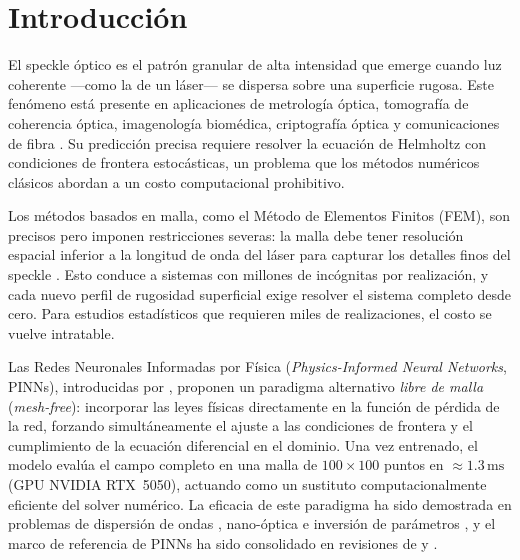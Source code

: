 
\section{Introducción}
\label{sec:intro}

El speckle óptico es el patrón granular de alta intensidad que emerge cuando luz coherente
---como la de un láser--- se dispersa sobre una superficie rugosa.
Este fenómeno está presente en aplicaciones de metrología óptica, tomografía de coherencia
óptica, imagenología biomédica, criptografía óptica y comunicaciones de fibra
\citep{Goodman2007_Speckle}.
Su predicción precisa requiere resolver la ecuación de Helmholtz con condiciones de frontera
estocásticas, un problema que los métodos numéricos clásicos abordan a un costo computacional
prohibitivo.

Los métodos basados en malla, como el Método de Elementos Finitos (FEM), son precisos pero
imponen restricciones severas: la malla debe tener resolución espacial inferior a la longitud
de onda del láser para capturar los detalles finos del speckle \citep{Jin2014_FEM}.
Esto conduce a sistemas con millones de incógnitas por realización, y cada nuevo perfil de
rugosidad superficial exige resolver el sistema completo desde cero.
Para estudios estadísticos que requieren miles de realizaciones, el costo se vuelve intratable.

Las Redes Neuronales Informadas por Física (\textit{Physics-Informed Neural Networks},
PINNs), introducidas por \citet{Raissi2019_PINNs}, proponen un paradigma alternativo
\textit{libre de malla} (\textit{mesh-free}): incorporar las leyes físicas directamente en la
función de pérdida de la red, forzando simultáneamente el ajuste a las condiciones de frontera
y el cumplimiento de la ecuación diferencial en el dominio.
Una vez entrenado, el modelo evalúa el campo completo en una malla de
$100 \times 100$ puntos en $\approx 1.3\,\mathrm{ms}$ (GPU NVIDIA RTX~5050),
actuando como un sustituto computacionalmente eficiente del solver numérico.
La eficacia de este paradigma ha sido demostrada en problemas de dispersión de ondas
\citep{Fang2020_scattering}, nano-óptica e inversión de parámetros
\citep{Chen2020_nanoptics}, y el marco de referencia de PINNs ha sido consolidado
en revisiones de \citet{Karniadakis2021_review} y \citet{Cuomo2022_review}.

